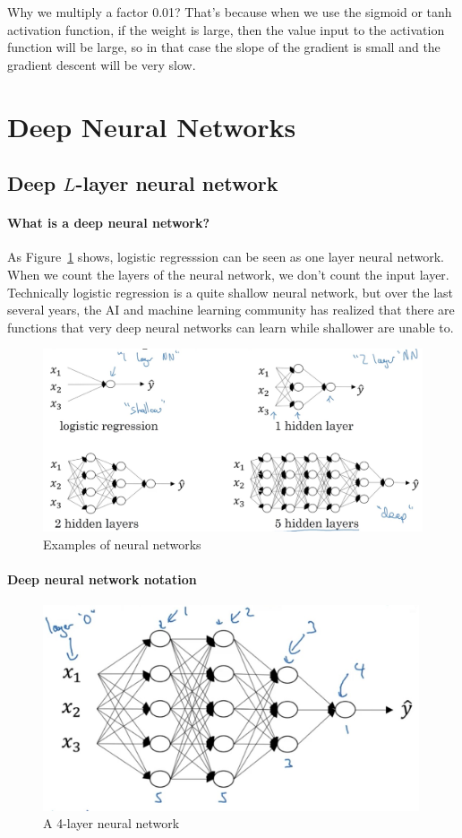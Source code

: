 \documentclass[UTF8]{article}
\begin{document}
Why we multiply a factor 0.01? That's because when we use the sigmoid or tanh activation function,
if the weight is large, then the value input to the activation function will be large, so in that
case the slope of the gradient is small and the gradient descent will be very slow.

\section{Deep Neural Networks}
\subsection{Deep $L$-layer neural network}
\paragraph{What is a deep neural network?}
As Figure~\ref{fig:nn-examples} shows, logistic regresssion can be
seen as one layer neural network. When we count the layers of the neural network, we don't count
the input layer. Technically logistic regression is a quite shallow neural network, but over the
last several years, the AI and machine learning community has realized that there are functions
that very deep neural networks can learn while shallower are unable to.
\begin{figure}[htb]
    \centering
    \includegraphics[width=45em]{figures/nn-examples}
    \caption{Examples of neural networks}
    \label{fig:nn-examples}
\end{figure}

\paragraph{Deep neural network notation}
\begin{figure}[htb]
    \centering
    \includegraphics[width=30em]{figures/four-layer-nn}
    \caption{A 4-layer neural network}
    \label{fig:four-layer-nn}
\end{figure}
\end{document}
